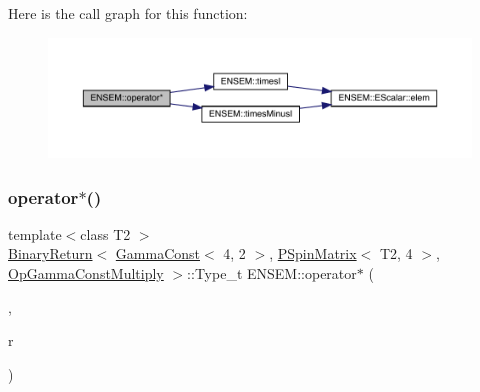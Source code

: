 Here is the call graph for this function\+:\nopagebreak
\begin{figure}[H]
\begin{center}
\leavevmode
\includegraphics[width=350pt]{d6/df5/group__primspinmatrix_gafa6af9df04bb90ce7675e5c8f4b13ac8_cgraph}
\end{center}
\end{figure}
\mbox{\label{group__primspinmatrix_ga55de5be902e508670e59d7c11c319618}} 
\subsubsection{\texorpdfstring{operator$\ast$()}{operator*()}\hspace{0.1cm}{\footnotesize\ttfamily [3/64]}}
{\footnotesize\ttfamily template$<$class T2 $>$ \\
\mbox{\hyperlink{structENSEM_1_1BinaryReturn}{Binary\+Return}}$<$ \mbox{\hyperlink{classENSEM_1_1GammaConst}{Gamma\+Const}}$<$ 4, 2 $>$, \mbox{\hyperlink{classENSEM_1_1PSpinMatrix}{P\+Spin\+Matrix}}$<$ T2, 4 $>$, \mbox{\hyperlink{structENSEM_1_1OpGammaConstMultiply}{Op\+Gamma\+Const\+Multiply}} $>$\+::Type\+\_\+t E\+N\+S\+E\+M\+::operator$\ast$ (\begin{DoxyParamCaption}\item[{const \mbox{\hyperlink{classENSEM_1_1GammaConst}{Gamma\+Const}}$<$ 4, 2 $>$ \&}]{,  }\item[{const \mbox{\hyperlink{classENSEM_1_1PSpinMatrix}{P\+Spin\+Matrix}}$<$ T2, 4 $>$ \&}]{r }\end{DoxyParamCaption})\hspace{0.3cm}{\ttfamily [inline]}}

\mbox{\label{group__primspinmatrix_gaeffd66ff58d2cd7122d34c77e7109255}} 
